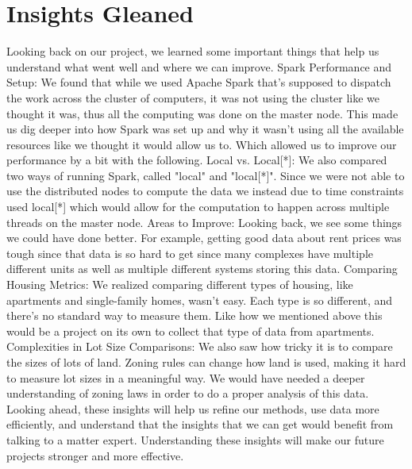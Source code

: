 \documentclass[titlepage]{article}
\begin{document}
\section{Insights Gleaned}
Looking back on our project, we learned some important things that help us understand what went well and where we can improve. Spark Performance and Setup: We found that while we used Apache Spark that's supposed to dispatch the work across the cluster of computers, it was not using the cluster like we thought it was, thus all the computing was done on the master node. This made us dig deeper into how Spark was set up and why it wasn't using all the available resources like we thought it would allow us to. Which allowed us to improve our performance by a bit with the following. Local vs. Local[*]: We also compared two ways of running Spark, called "local" and "local[*]". Since we were not able to use the distributed nodes to compute the data we instead due to time constraints used local[*] which would allow for the computation to happen across multiple threads on the master node. Areas to Improve: Looking back, we see some things we could have done better. For example, getting good data about rent prices was tough since that data is so hard to get since many complexes have multiple different units as well as multiple different systems storing this data. Comparing Housing Metrics: We realized comparing different types of housing, like apartments and single-family homes, wasn't easy. Each type is so different, and there's no standard way to measure them. Like how we mentioned above this would be a project on its own to collect that type of data from apartments. Complexities in Lot Size Comparisons: We also saw how tricky it is to compare the sizes of lots of land. Zoning rules can change how land is used, making it hard to measure lot sizes in a meaningful way. We would have needed a deeper understanding of zoning laws in order to do a proper analysis of this data. Looking ahead, these insights will help us refine our methods, use data more efficiently, and understand that the insights that we can get would benefit from talking to a matter expert. Understanding these insights will make our future projects stronger and more effective.
\end{document}
